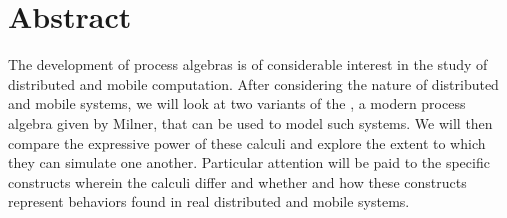 \chapter*{Abstract}
The development of process algebras is of considerable interest in the study of distributed and mobile computation.  After considering the nature of distributed and mobile systems, we will look at two variants of the \picalc, a modern process algebra given by Milner, that can be used to model such systems.  We will then compare the expressive power of these calculi and explore the extent to which they can simulate one another.  Particular attention will be paid to the specific constructs wherein the calculi differ and whether and how these constructs represent behaviors found in real distributed and mobile systems.  
